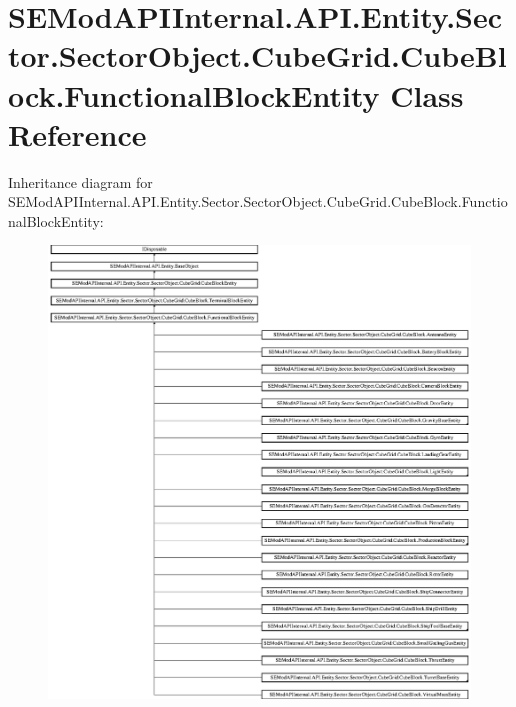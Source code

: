 \hypertarget{class_s_e_mod_a_p_i_internal_1_1_a_p_i_1_1_entity_1_1_sector_1_1_sector_object_1_1_cube_grid_1_1812fd8c680c89505110622077dbb917a}{}\section{S\+E\+Mod\+A\+P\+I\+Internal.\+A\+P\+I.\+Entity.\+Sector.\+Sector\+Object.\+Cube\+Grid.\+Cube\+Block.\+Functional\+Block\+Entity Class Reference}
\label{class_s_e_mod_a_p_i_internal_1_1_a_p_i_1_1_entity_1_1_sector_1_1_sector_object_1_1_cube_grid_1_1812fd8c680c89505110622077dbb917a}
Inheritance diagram for S\+E\+Mod\+A\+P\+I\+Internal.\+A\+P\+I.\+Entity.\+Sector.\+Sector\+Object.\+Cube\+Grid.\+Cube\+Block.\+Functional\+Block\+Entity\+:\begin{figure}[H]
\begin{center}
\leavevmode
\includegraphics[height=12.000000cm]{class_s_e_mod_a_p_i_internal_1_1_a_p_i_1_1_entity_1_1_sector_1_1_sector_object_1_1_cube_grid_1_1812fd8c680c89505110622077dbb917a}
\end{center}
\end{figure}
